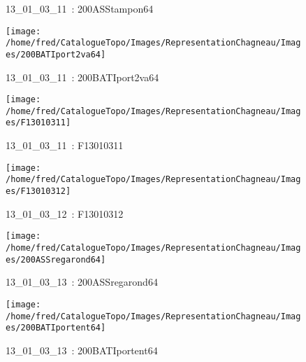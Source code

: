 \documentclass[12pt,titlepage,oneside]{book}
\begin{document}
\begin{figure}[h!]
\begin{minipage}[t]{3cm}
\begin{center}
      \caption[~13\_01\_03\_11]{\small{13\_01\_03\_11~:} \tiny{200ASStampon64}}\label{200ASStampon64}
    \end{center}
  \end{minipage}
  \begin{minipage}[t]{3cm}
    \begin{center}
      \texttt{[image: /home/fred/CatalogueTopo/Images/RepresentationChagneau/Images/200BATIport2va64]}
      \caption[~13\_01\_03\_11]{\small{13\_01\_03\_11~:} \tiny{200BATIport2va64}}\label{200BATIport2va64}
    \end{center}
  \end{minipage}
  \begin{minipage}[t]{3cm}
    \begin{center}
      \texttt{[image: /home/fred/CatalogueTopo/Images/RepresentationChagneau/Images/F13010311]}
      \caption[~13\_01\_03\_11]{\small{13\_01\_03\_11~:} \tiny{F13010311}}\label{F13010311}
    \end{center}
  \end{minipage}
  \begin{minipage}[t]{3cm}
    \begin{center}
      \texttt{[image: /home/fred/CatalogueTopo/Images/RepresentationChagneau/Images/F13010312]}
      \caption[~13\_01\_03\_12]{\small{13\_01\_03\_12~:} \tiny{F13010312}}\label{F13010312}
    \end{center}
  \end{minipage}
  \begin{minipage}[t]{3cm}
    \begin{center}
      \texttt{[image: /home/fred/CatalogueTopo/Images/RepresentationChagneau/Images/200ASSregarond64]}
      \caption[~13\_01\_03\_13]{\small{13\_01\_03\_13~:} \tiny{200ASSregarond64}}\label{200ASSregarond64}
    \end{center}
  \end{minipage}
  \begin{minipage}[t]{3cm}
    \begin{center}
      \texttt{[image: /home/fred/CatalogueTopo/Images/RepresentationChagneau/Images/200BATIportent64]}
      \caption[~13\_01\_03\_13]{\small{13\_01\_03\_13~:} \tiny{200BATIportent64}}\label{200BATIportent64}
    \end{center}

\end{minipage}
\end{figure}
\end{document}
